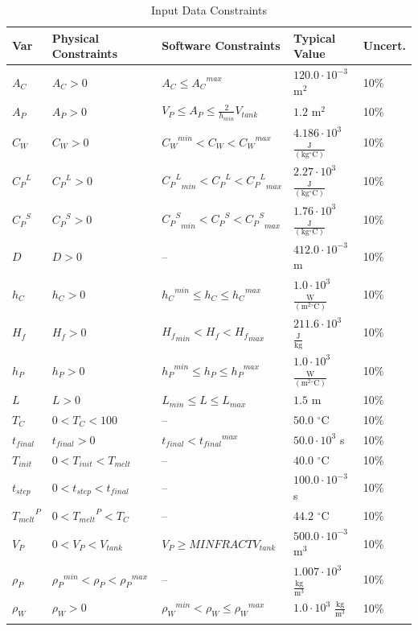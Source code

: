 \documentclass[12pt]{article}
\begin{document}
\begin{longtable}{l l l l l}
\toprule
Var & Physical Constraints & Software Constraints & Typical Value & Uncert.
\\
\midrule
\endhead
${A_{C}}$ & ${A_{C}}>0$ & ${A_{C}}\leq{}{{A_{C}}^{max}}$ & $120.0\cdot{}10^{-3}$ $\text{m}^{2}$ & 10$\%$
\\
${A_{P}}$ & ${A_{P}}>0$ & ${V_{P}}\leq{}{A_{P}}\leq{}\frac{2}{{h_{min}}} {V_{tank}}$ & $1.2$ $\text{m}^{2}$ & 10$\%$
\\
${C_{W}}$ & ${C_{W}}>0$ & ${{C_{W}}^{min}}<{C_{W}}<{{C_{W}}^{max}}$ & $4.186\cdot{}10^{3}$ $\frac{\text{J}}{(\text{kg}{}^{\circ}\text{C})}$ & 10$\%$
\\
${{C_{P}}^{L}}$ & ${{C_{P}}^{L}}>0$ & ${{{C_{P}}^{L}}_{min}}<{{C_{P}}^{L}}<{{{C_{P}}^{L}}_{max}}$ & $2.27\cdot{}10^{3}$ $\frac{\text{J}}{(\text{kg}{}^{\circ}\text{C})}$ & 10$\%$
\\
${{C_{P}}^{S}}$ & ${{C_{P}}^{S}}>0$ & ${{{C_{P}}^{S}}_{min}}<{{C_{P}}^{S}}<{{{C_{P}}^{S}}_{max}}$ & $1.76\cdot{}10^{3}$ $\frac{\text{J}}{(\text{kg}{}^{\circ}\text{C})}$ & 10$\%$
\\
$D$ & $D>0$ & -- & $412.0\cdot{}10^{-3}$ m & 10$\%$
\\
${h_{C}}$ & ${h_{C}}>0$ & ${{h_{C}}^{min}}\leq{}{h_{C}}\leq{}{{h_{C}}^{max}}$ & $1.0\cdot{}10^{3}$ $\frac{\text{W}}{(\text{m}^{2}{}^{\circ}\text{C})}$ & 10$\%$
\\
${H_{f}}$ & ${H_{f}}>0$ & ${{H_{f}}_{min}}<{H_{f}}<{{H_{f}}_{max}}$ & $211.6\cdot{}10^{3}$ $\frac{\text{J}}{\text{kg}}$ & 10$\%$
\\
${h_{P}}$ & ${h_{P}}>0$ & ${{h_{P}}^{min}}\leq{}{h_{P}}\leq{}{{h_{P}}^{max}}$ & $1.0\cdot{}10^{3}$ $\frac{\text{W}}{(\text{m}^{2}{}^{\circ}\text{C})}$ & 10$\%$
\\
$L$ & $L>0$ & ${L_{min}}\leq{}L\leq{}{L_{max}}$ & $1.5$ m & 10$\%$
\\
${T_{C}}$ & $0<{T_{C}}<100$ & -- & $50.0$ ${}^{\circ}$C & 10$\%$
\\
${t_{final}}$ & ${t_{final}}>0$ & ${t_{final}}<{{t_{final}}^{max}}$ & $50.0\cdot{}10^{3}$ s & 10$\%$
\\
${T_{init}}$ & $0<{T_{init}}<{T_{melt}}$ & -- & $40.0$ ${}^{\circ}$C & 10$\%$
\\
${t_{step}}$ & $0<{t_{step}}<{t_{final}}$ & -- & $100.0\cdot{}10^{-3}$ s & 10$\%$
\\
${{T_{melt}}^{P}}$ & $0<{{T_{melt}}^{P}}<{T_{C}}$ & -- & $44.2$ ${}^{\circ}$C & 10$\%$
\\
${V_{P}}$ & $0<{V_{P}}<{V_{tank}}$ & ${V_{P}}\geq{}MINFRACT {V_{tank}}$ & $500.0\cdot{}10^{-3}$ $\text{m}^{3}$ & 10$\%$
\\
${ρ_{P}}$ & ${{ρ_{P}}^{min}}<{ρ_{P}}<{{ρ_{P}}^{max}}$ & -- & $1.007\cdot{}10^{3}$ $\frac{\text{kg}}{\text{m}^{3}}$ & 10$\%$
\\
${ρ_{W}}$ & ${ρ_{W}}>0$ & ${{ρ_{W}}^{min}}<{ρ_{W}}\leq{}{{ρ_{W}}^{max}}$ & $1.0\cdot{}10^{3}$ $\frac{\text{kg}}{\text{m}^{3}}$ & 10$\%$
\\
\bottomrule
\caption{Input Data Constraints}
\label{Table:InDataConstraints}
\end{longtable}
\end{document}
